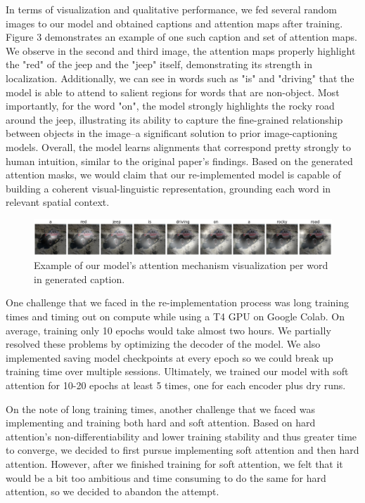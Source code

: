 \documentclass{article}
\begin{document}
In terms of visualization and qualitative performance, we fed several random images to our model and obtained captions and attention maps after training. Figure 3 demonstrates an example of one such caption and set of attention maps. We observe in the second and third image, the attention maps properly highlight the "red" of the jeep and the "jeep" itself, demonstrating its strength in localization. Additionally, we can see in words such as "is" and "driving" that the model is able to attend to salient regions for words that are non-object. Most importantly, for the word "on", the model strongly highlights the rocky road around the jeep, illustrating its ability to capture the fine-grained relationship between objects in the image--a significant solution to prior image-captioning models. Overall, the model learns alignments that correspond pretty strongly to human intuition, similar to the original paper's findings. Based on the generated attention masks, we would claim that our re-implemented model is capable of building a coherent visual-linguistic representation, grounding each word in relevant spatial context. 

\begin{figure}[h]
    \centering
    \includegraphics[width=0.75\linewidth]{example-jeep.png}
    \caption{Example of our model's attention mechanism visualization per word in generated caption.}
    \label{fig:enter-label}
\end{figure}

One challenge that we faced in the re-implementation process was long training times and timing out on compute while using a T4 GPU on Google Colab. On average, training only 10 epochs would take almost two hours. We partially resolved these problems by optimizing the decoder of the model. We also implemented saving model checkpoints at every epoch so we could break up training time over multiple sessions. Ultimately, we trained our model with soft attention for 10-20 epochs at least 5 times, one for each encoder plus dry runs.

On the note of long training times, another challenge that we faced was implementing and training both hard and soft attention. Based on hard attention's non-differentiability and lower training stability and thus greater time to converge, we decided to first pursue implementing soft attention and then hard attention. However, after we finished training for soft attention, we felt that it would be a bit too ambitious and time consuming to do the same for hard attention, so we decided to abandon the attempt.
\end{document}
